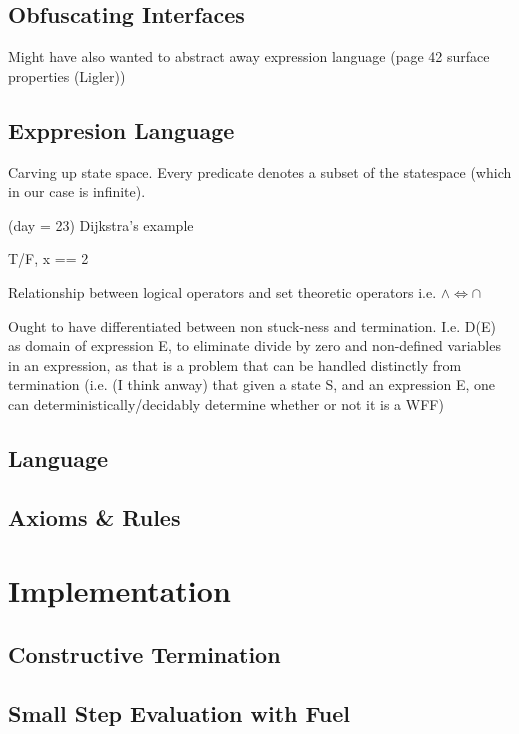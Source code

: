 \documentclass[oneside,12pt]{article}
\begin{document}
\subsection{Obfuscating Interfaces}

Might have also wanted to abstract away expression language
(page 42 surface properties (Ligler))

\subsection{Exppresion Language}

Carving up state space.
Every predicate denotes a subset of the statespace
(which in our case is infinite).

(day = 23) Dijkstra's example

T/F, x == 2

Relationship between logical operators and set theoretic operators
i.e. $\wedge \Leftrightarrow \cap$


Ought to have differentiated between non stuck-ness and termination. I.e. D(E) as domain of expression E, to eliminate divide by zero and non-defined variables in an expression, as that is a problem that can be handled distinctly from termination
(i.e. (I think anway) that given a state S, and an expression E, one can deterministically/decidably determine whether or not it is a WFF)

\subsection{Language}

\subsection{Axioms \& Rules}

\section{Implementation}

\subsection{Constructive Termination}

\subsection{Small Step Evaluation with Fuel}
\end{document}
